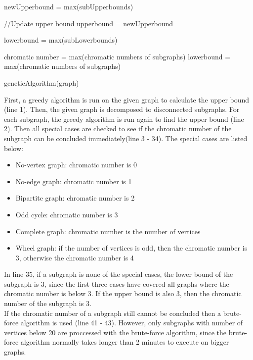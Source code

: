 \documentclass[a4paper]{report}
\begin{document}
		\begin{algorithm}                     
			\begin{algorithmic} [1]     

			\STATE newUpperbound = max(subUpperbounds)
			
			\STATE //Update upper bound
			\STATE upperbound = newUpperbound 
			\ENDIF
			
			\STATE lowerbound = max(subLowerbounds)
			
			\STATE chromatic number = max(chromatic numbers of subgraphs)
			\ELSE
			\STATE lowerbound = max(chromatic numbers of subgraphs)
			\ENDIF
			
			\STATE geneticAlgorithm(graph)
		\end{algorithmic}
	\end{algorithm}
	First, a greedy algorithm is run on the given graph to calculate the upper bound (line 1). Then, the given graph is decomposed to disconnected subgraphs. For each subgraph, the greedy algorithm is run again to find the upper bound (line 2). Then all special cases are checked to see if the chromatic number of the subgraph can be concluded immediately(line 3 - 34). The special cases are listed below: 
	\begin{itemize}
		\item No-vertex graph: chromatic number is 0
		\item No-edge graph: chromatic number is 1
		\item Bipartite graph: chromatic number is 2
		\item Odd cycle: chromatic number is 3
		\item Complete graph: chromatic number is the number of vertices
		\item Wheel graph: if the number of vertices is odd, then the chromatic number is 3, otherwise the chromatic number is 4
	\end{itemize}
	In line 35, if a subgraph is none of the special cases, the lower bound of the subgraph is 3, since the first three cases have covered all graphs where the chromatic number is below 3. If the upper bound is also 3, then the chromatic number of the subgraph is 3. \\
	If the chromatic number of a subgraph still cannot be concluded then a brute-force algorithm is used (line 41 - 43). However, only subgraphs with number of vertices below 20 are proccessed with the brute-force algorithm, since the brute-force algorithm normally takes longer than 2 minutes to execute on bigger graphs. \\
\end{document}
